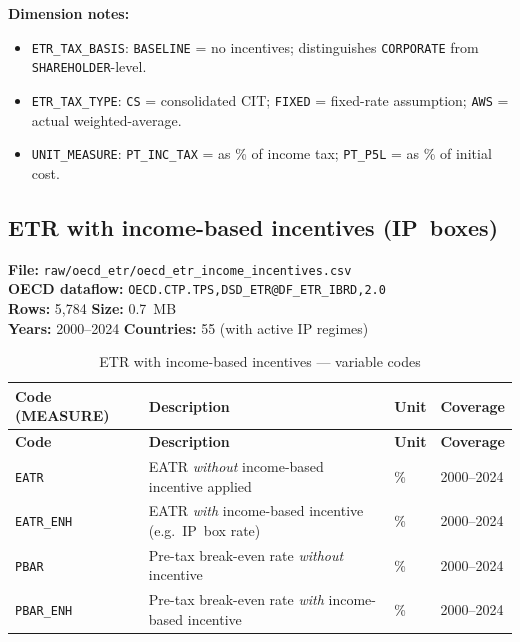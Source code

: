 \documentclass[11pt,a4paper]{article}
\newcommand{\code}[1]{\texttt{#1}}
\begin{document}
\noindent\textbf{Dimension notes:}
\begin{itemize}[noitemsep]
    \item \texttt{ETR\_TAX\_BASIS}: \texttt{BASELINE} = no incentives; distinguishes \texttt{CORPORATE} from \texttt{SHAREHOLDER}-level.
    \item \texttt{ETR\_TAX\_TYPE}: \texttt{CS} = consolidated CIT; \texttt{FIXED} = fixed-rate assumption; \texttt{AWS} = actual weighted-average.
    \item \texttt{UNIT\_MEASURE}: \texttt{PT\_INC\_TAX} = as \% of income tax; \texttt{PT\_P5L} = as \% of initial cost.
\end{itemize}

\subsection{ETR with income-based incentives (IP~boxes)}

\textbf{File:} \texttt{raw/oecd\_etr/oecd\_etr\_income\_incentives.csv}\\
\textbf{OECD dataflow:} \texttt{OECD.CTP.TPS,DSD\_ETR@DF\_ETR\_IBRD,2.0}\\
\textbf{Rows:} 5{,}784 \quad \textbf{Size:} 0.7~MB\\
\textbf{Years:} 2000--2024 \quad \textbf{Countries:} 55 (with active IP regimes)

\begin{longtable}{@{}L{3.2cm} L{6.0cm} C{2.0cm} C{2.5cm}@{}}
\caption{ETR with income-based incentives --- variable codes}\label{tab:etr_income}\\
\toprule
\textbf{Code (MEASURE)} & \textbf{Description} & \textbf{Unit} & \textbf{Coverage} \\
\midrule
\endfirsthead
\toprule
\textbf{Code} & \textbf{Description} & \textbf{Unit} & \textbf{Coverage} \\
\midrule
\endhead
\bottomrule
\endlastfoot
\code{EATR}       & EATR \emph{without} income-based incentive applied & \% & 2000--2024 \\
\code{EATR\_ENH}  & EATR \emph{with} income-based incentive (e.g.\ IP~box rate) & \% & 2000--2024 \\
\code{PBAR}       & Pre-tax break-even rate \emph{without} incentive & \% & 2000--2024 \\
\code{PBAR\_ENH}  & Pre-tax break-even rate \emph{with} income-based incentive & \% & 2000--2024 \\
\end{longtable}
\end{document}
